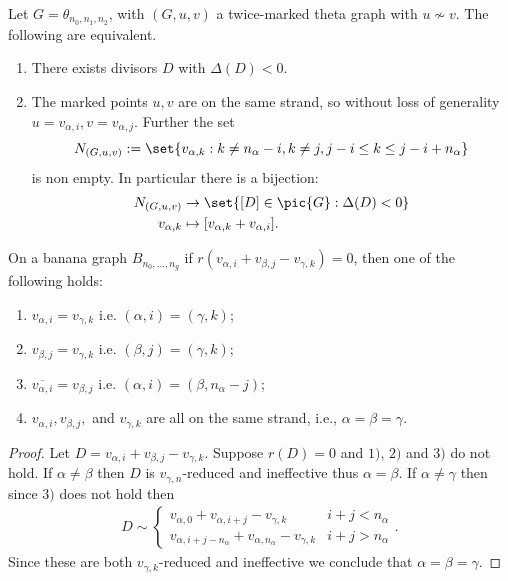 \begin{theorem}\label{thm-NonSubmodGenus2}
Let $G = \theta_{n_0,n_1,n_2}$, with $(G,u,v)$ a twice-marked theta graph with $u\not \sim v$. The following are equivalent.
\begin{enumerate}[label = \arabic*)]
    \item There exists divisors $D$ with $\Delta(D)<0$.
    \item The marked points $u,v$ are on the same strand, so without loss of generality $u = v_{\alpha,i},v = v_{\alpha,j}$. Further the set
    $$N_{(G,u,v)} := \set{v_{\alpha,k}:k \neq n_\alpha -i, k \neq j, j-i\leq k \leq j-i+n_\alpha}$$ is non empty. In particular there is a bijection:
    \begin{align*}
        N_{(G,u,v)} &\to \set{[D]\in\pic{G}:\Delta(D)<0}\\
        v_{\alpha,k} & \mapsto [v_{\alpha,k}+v_{\alpha,i}].
    \end{align*}
\end{enumerate}
\end{theorem}




\begin{lemma}\label{lem-SameStrand}
    On a banana graph $B_{n_0,\dots,n_g}$ if $r(v_{\alpha,i}+v_{\beta,j}-v_{\gamma,k}) = 0$, then one of the following holds:
    \begin{enumerate}[label = \arabic*)]
        \item $v_{\alpha,i} = v_{\gamma,k}$ i.e. $(\alpha,i) = (\gamma,k)$;
        \item $v_{\beta,j} = v_{\gamma,k}$ i.e. $(\beta,j) = (\gamma,k)$;
        \item $\overline{v_{\alpha,i}} = v_{\beta,j}$ i.e. $(\alpha,i) = (\beta,n_\alpha-j)$;
        \item $v_{\alpha,i},v_{\beta,j},$ and $v_{\gamma,k}$ are all on the same strand, i.e., $\alpha = \beta = \gamma$.
    \end{enumerate}
\end{lemma}

\begin{proof}
    Let $D = v_{\alpha,i}+v_{\beta,j}-v_{\gamma,k}$. Suppose $r(D) = 0$ and $1)$, $2)$ and $3)$ do not hold. If $\alpha \neq \beta$ then $D$ is $v_{\gamma,n}$-reduced and ineffective thus $\alpha = \beta$. If $\alpha \neq \gamma$ then since $3)$ does not hold then
    \begin{align*}
        D \sim \begin{cases}
            v_{\alpha,0}+v_{\alpha,i+j} - v_{\gamma,k} & i + j < n_\alpha\\
            v_{\alpha,i + j - n_\alpha}+v_{\alpha,n_\alpha}-v_{\gamma,k} & i +j > n_\alpha
        \end{cases}.
    \end{align*}
    Since these are both $v_{\gamma,k}$-reduced and ineffective we conclude that $\alpha = \beta = \gamma$.
\end{proof}

